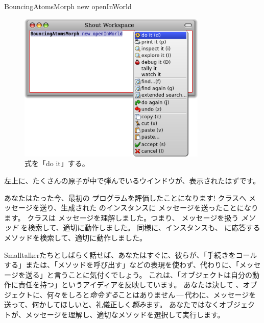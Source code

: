 \documentclass[a4paper,10pt,twoside]{book}
\begin{document}

\begin{code}{}
BouncingAtomsMorph new openInWorld
\end{code}


\begin{figure}[htb]
\centerline {\includegraphics[width=0.8\textwidth]{Doit}}
\caption{式を「do it」する。}
\end{figure}

左上に、たくさんの原子が中で弾んでいるウインドウが、表示されたはずです。

あなたはたった今、最初の \st プログラムを評価したことになります!
\bam クラスへ  メッセージを送り、生成された \bam のインスタンスに  メッセージを送ったことになります。
\bam クラスは  メッセージを理解しました。つまり、 メッセージを扱う \emph{メソッド} を検索して、適切に動作しました。
同様に、\bam インスタンスも、 に応答するメソッドを検索して、適切に動作しました。

Smalltalkerたちとしばらく話せば、あなたはすぐに、彼らが、「手続きをコールする」または、「メソッドを呼び出す」などの表現を使わず、代わりに、「メッセージを送る」と言うことに気付くでしょう。
これは、「オブジェクトは自分の動作に責任を持つ」というアイディアを反映しています。
あなたは決して 、オブジェクトに、何々をしろと\emph{命令する}ことはありません\,---\,代わに、メッセージを送って、何かしてほしいと、礼儀正しく\emph{頼み}ます。
あなたではなくオブジェクトが、メッセージを理解し、適切なメソッドを選択して実行します。
\end{document}
